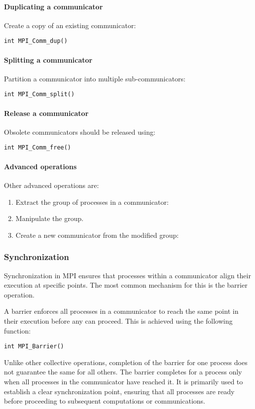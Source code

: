 \paragraph*{Duplicating a communicator}
Create a copy of an existing communicator:
\begin{lstlisting}[style=C]
int MPI_Comm_dup()
\end{lstlisting}

\paragraph*{Splitting a communicator}
Partition a communicator into multiple sub-communicators:
\begin{lstlisting}[style=C]
int MPI_Comm_split()
\end{lstlisting}

\paragraph*{Release a communicator}
Obsolete communicators should be released using:
\begin{lstlisting}[style=C]
int MPI_Comm_free()
\end{lstlisting}

\paragraph*{Advanced operations}
Other advanced operations are: 
\begin{enumerate}
    \item Extract the group of processes in a communicator: 
    \item Manipulate the group. 
    \item Create a new communicator from the modified group: 
\end{enumerate}

\subsubsection{Synchronization}
Synchronization in MPI ensures that processes within a communicator align their execution at specific points. 
The most common mechanism for this is the barrier operation.

A barrier enforces all processes in a communicator to reach the same point in their execution before any can proceed. 
This is achieved using the following function:
\begin{lstlisting}[style=C]
int MPI_Barrier()
\end{lstlisting}
Unlike other collective operations, completion of the barrier for one process does not guarantee the same for all others. 
The barrier completes for a process only when all processes in the communicator have reached it.
It is primarily used to establish a clear synchronization point, ensuring that all processes are ready before proceeding to subsequent computations or communications.


